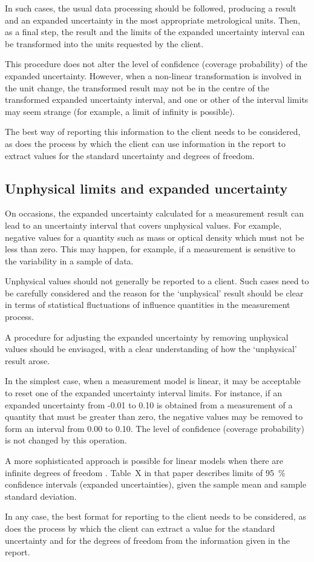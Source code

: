 In such cases, the usual data processing should be followed, producing a result and an expanded uncertainty in the most appropriate metrological units. Then, as a final step, the result and the limits of the expanded uncertainty interval can be transformed into the units requested by the client. 

This procedure does not alter the level of confidence (coverage probability) of the expanded uncertainty. However, when a non-linear transformation is involved in the unit change, the transformed result may not be in the centre of the transformed expanded uncertainty interval, and one or other of the interval limits may seem strange (for example, a limit of infinity is possible).
 
The best way of reporting this information to the client needs to be considered, as does the process by which the client can use information in the report to extract values for the standard uncertainty and degrees of freedom.

\subsection{Unphysical limits and expanded uncertainty}
On occasions, the expanded uncertainty calculated for a measurement result can lead to an uncertainty interval that covers unphysical values.  For example, negative values for a quantity such as mass or optical density which must not be less than zero. This may happen, for example, if a measurement is sensitive to the variability in a sample of data. 

Unphysical values should not generally be reported to a client.
Such cases need to be carefully considered and the reason for the ‘unphysical’ result should be clear in terms of statistical fluctuations of influence quantities in the measurement process.  

A procedure for adjusting the expanded uncertainty by removing unphysical values should be envisaged, with a clear understanding of how the ‘unphysical’ result arose. 

In the simplest case, when a measurement model is linear, it may be acceptable to reset one of the expanded uncertainty interval limits. For instance, if an expanded uncertainty from -0.01 to 0.10 is obtained from a measurement of a quantity that must be greater than zero, the negative values may be removed to form an interval from 0.00 to 0.10. The level of confidence (coverage probability) is not changed by this operation.

A more sophisticated approach is possible for linear models when there are infinite degrees of freedom \cite{FELDMAN_COUSINS_99}. Table~X in that paper describes limits of \SI{95}{\%} confidence intervals (expanded uncertainties), given the sample mean and sample standard deviation.

In any case, the best format for reporting to the client needs to be considered, as does the process by which the client can extract a value for the standard uncertainty and for the degrees of freedom from the information given in the report.

